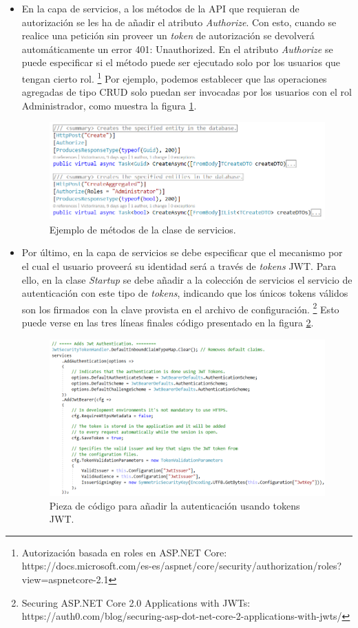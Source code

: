 \documentclass[11pt,spanish,listoffigures]{tfgetsinf}
\begin{document}
\begin{itemize}
\item En la capa de servicios, a los métodos de la API que requieran de autorización se les ha de añadir el atributo \textit{Authorize}. Con esto, cuando se realice una petición sin proveer un \textit{token} de autorización se devolverá automáticamente un error 401: Unauthorized. En el atributo \textit{Authorize} se puede especificar si el método puede ser ejecutado solo por los usuarios que tengan cierto rol. \footnote{ Autorización basada en roles en ASP.NET Core: https://docs.microsoft.com/es-es/aspnet/core/security/authorization/roles?view=aspnetcore-2.1} Por ejemplo, podemos establecer que las operaciones agregadas de tipo CRUD solo puedan ser invocadas por los usuarios con el rol Administrador, como muestra la figura \ref{fig:Authorize}.

\begin{figure}[h]
\centering
\includegraphics[scale=0.7]{Authorize}
\caption{Ejemplo de métodos de la clase de servicios.}
\label{fig:Authorize}
\end{figure}

\item Por último, en la capa de servicios se debe especificar que el mecanismo por el cual el usuario proveerá su identidad será a través de \textit{tokens} JWT. Para ello, en la clase \textit{Startup} se debe añadir a la colección de servicios el servicio de autenticación con este tipo de \textit{tokens}, indicando que los únicos tokens válidos son los firmados con la clave provista en el archivo de configuración. \footnote{ Securing ASP.NET Core 2.0 Applications with JWTs: https://auth0.com/blog/securing-asp-dot-net-core-2-applications-with-jwts/} Esto puede verse en las tres líneas finales código presentado en la figura \ref{fig:jwt}.

\begin{figure}[h]
\centering
\includegraphics[scale=0.7]{jwt}
\caption{Pieza de código para añadir la autenticación usando tokens JWT.}
\label{fig:jwt}
\end{figure}


\end{itemize}
\end{document}
